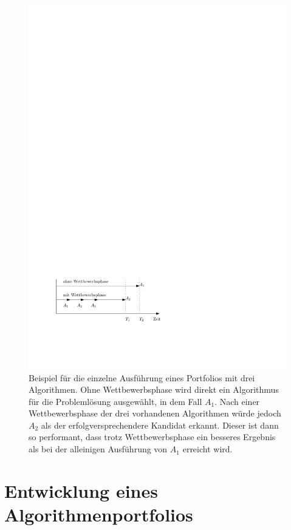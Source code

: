 \begin{figure}[h]
\centering
\includegraphics{einzelne.pdf}
\caption[Einzelne Ausf\"uhrung]{Beispiel für die einzelne Ausführung eines Portfolios mit drei Algorithmen. Ohne Wettbewerbsphase wird direkt ein Algorithmus für die Problemlösung ausgewählt, in dem Fall $A_1$. Nach einer Wettbewerbsphase der drei vorhandenen Algorithmen würde jedoch $A_2$ als der erfolgversprechendere Kandidat erkannt. Dieser ist dann so performant, dass trotz Wettbewerbsphase ein besseres Ergebnis als bei der alleinigen Ausführung von $A_1$ erreicht wird.}
\label{einzelne}
\end{figure}

\section{Entwicklung eines Algorithmenportfolios}

